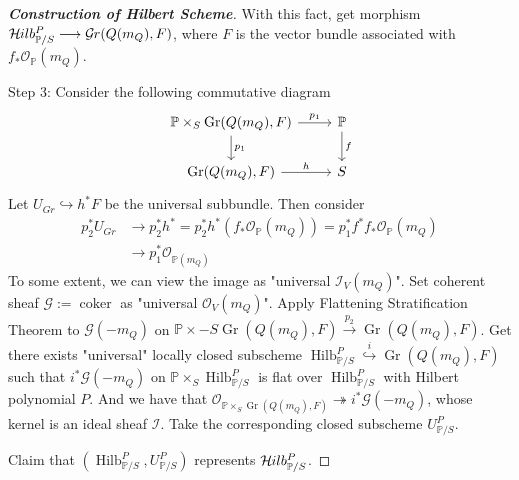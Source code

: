 \documentclass{ctexart}
\newcommand{\coker}{\operatorname{coker}}
\newcommand{\grassmannianscheme}[2]{\operatorname{Gr}(#1, #2)}
\newcommand{\grassmanmianfunctor}[2]{\mathcal{G}\kern -.5pt r(#1, #2)}
\newcommand{\hilbertscheme}{\operatorname{Hilb}}
\newcommand{\hilbertfunctor}{\mathcal{H}\kern -.5pt ilb}
\begin{document}
\begin{proof}[\textbf{\emph{Construction of Hilbert Scheme}}]
    With this fact, get morphism $\hilbertfunctor_{\mathbb{P}/S}^{P} \longrightarrow \grassmanmianfunctor{Q(m_{Q})}{F}$, 
    where $F$ is the vector bundle associated with $f_{\ast}\mathcal{O}_{\mathbb{P}}(m_{Q})$.
    \par
    Step 3: Consider the following commutative diagram
    \begin{equation*}
        \begin{tikzcd}
            \mathbb{P} \times_{S} \grassmannianscheme{Q(m_{Q})}{F} \arrow[r, "p_{1}"] \arrow[d, "p_{1}"] &
            \mathbb{P} \arrow[d, "f"] \\
            \grassmannianscheme{Q(m_{Q})}{F} \arrow[r, "h"] &
            S
        \end{tikzcd}
    \end{equation*}
    Let $U_{Gr} \hookrightarrow h^{\ast}F$ be the universal subbundle.
    Then consider
    \begin{equation*}
        \begin{split}
            p_{2}^{\ast}U_{Gr} & \longrightarrow p_{2}^{\ast}h^{\ast} = p_{2}^{\ast}h^{\ast}(f_{\ast}\mathcal{O}_{\mathbb{P}}(m_{Q})) = p_{1}^{\ast}f^{\ast}f_{\ast}\mathcal{O}_{\mathbb{P}}(m_{Q}) \\
            & \longrightarrow p_{1}^{\ast}\mathcal{O}_{\mathbb{P}(m_{Q})}
        \end{split}
    \end{equation*}
    To some extent, we can view the image as "universal $\mathcal{I}_{V}(m_{Q})$".
    Set coherent sheaf $\mathcal{G} := \coker$ as "universal $\mathcal{O}_{V}(m_{Q})$".
    Apply Flattening Stratification Theorem to $\mathcal{G}(-m_{Q})$ on $\mathbb{P} \times-{S} \grassmannianscheme{Q(m_{Q})}{F} \overset{p_{2}}{\longrightarrow} \grassmannianscheme{Q(m_{Q})}{F}$.
    Get there exists "universal" locally closed subscheme $\hilbertscheme_{\mathbb{P}/S}^{P} \overset{i}{\hookrightarrow} \grassmannianscheme{Q(m_{Q})}{F}$ such that $i^{\ast}\mathcal{G}(-m_{Q})$ on $\mathbb{P} \times_{S} \hilbertscheme_{\mathbb{P}/S}^{P}$ is flat over $\hilbertscheme_{\mathbb{P}/S}^{P}$ with Hilbert polynomial $P$.
    And we have that $\mathcal{O}_{\mathbb{P} \times_{S} \grassmannianscheme{Q(m_{Q})}{F}} \twoheadrightarrow i^{\ast}\mathcal{G}(-m_{Q})$, whose kernel is an ideal sheaf $\mathcal{I}$.
    Take the corresponding closed subscheme $U_{\mathbb{P}/S}^{P}$.
    \par
    Claim that $(\hilbertscheme_{\mathbb{P}/S}^{P}, U_{\mathbb{P}/S}^{P})$ represents $\hilbertfunctor_{\mathbb{P}/S}^{P}$.

\end{proof}
\end{document}
